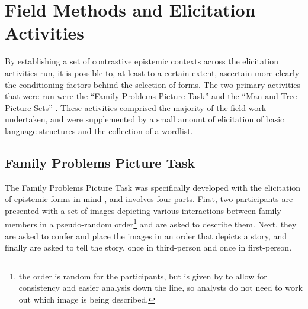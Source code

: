\section{Field Methods and Elicitation Activities}
By establishing a set of contrastive epistemic contexts across the elicitation activities run, it is possible to, at least to a certain extent, ascertain more clearly the conditioning factors behind the selection of forms. The two primary activities that were run were the ``Family Problems Picture Task'' \cite{SanRoque2012a} and the ``Man and Tree Picture Sets'' \cite{Levinson1992}. These activities comprised the majority of the field work undertaken, and were supplemented by a small amount of elicitation of basic language structures and the collection of a wordlist.

\subsection{Family Problems Picture Task}\label{p:Methods:FamilyProblems}
The Family Problems Picture Task was specifically developed with the elicitation of epistemic forms in mind \cite{SanRoque2012a}, and involves four parts. First, two participants are presented with a set of images \cite{Carroll2009} depicting various interactions between family members in a pseudo-random order\footnote{the order is random for the participants, but is given by  to allow for consistency and easier analysis down the line, so analysts do not need to work out which image is being described.} and are asked to describe them. Next, they are asked to confer and place the images in an order that depicts a story, and finally are asked to tell the story, once in third-person and once in first-person.

